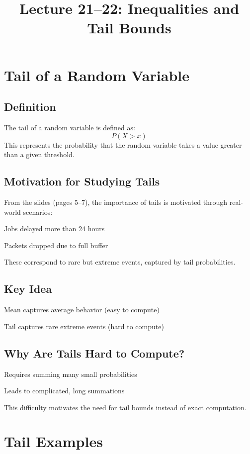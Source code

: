 \documentclass[11pt]{article}
\title{Lecture 21--22: Inequalities and Tail Bounds}
\date{}
\begin{document}
\maketitle

\section{Tail of a Random Variable}

\subsection{Definition}

The tail of a random variable is defined as:
\[
P(X > x)
\]
This represents the probability that the random variable takes a value greater than a given threshold.

\subsection{Motivation for Studying Tails}

From the slides (pages 5--7), the importance of tails is motivated through real-world scenarios:

Jobs delayed more than 24 hours

Packets dropped due to full buffer

These correspond to rare but extreme events, captured by tail probabilities.

\subsection{Key Idea}

Mean captures average behavior (easy to compute)

Tail captures rare extreme events (hard to compute)

\subsection{Why Are Tails Hard to Compute?}

Requires summing many small probabilities

Leads to complicated, long summations

This difficulty motivates the need for tail bounds instead of exact computation.

\section{Tail Examples}
\end{document}
